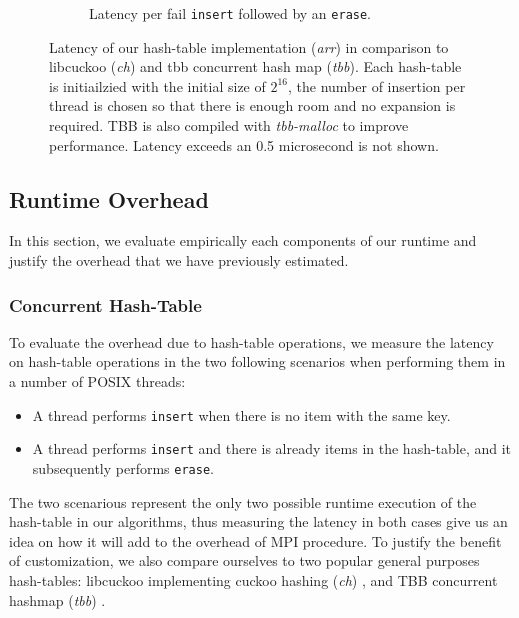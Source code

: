 \begin{figure}[ht]
\begin{adjustbox}{width=\textwidth}
\begin{subfigure}{\columnwidth}
      \caption{Latency per fail \texttt{insert} followed by an \texttt{erase}.}
    \end{subfigure}
  \end{adjustbox}

  \caption{Latency of our hash-table implementation (\textit{arr}) in comparison
  to libcuckoo (\textit{ch}) and tbb concurrent hash map (\textit{tbb}).  Each
  hash-table is initiailzied with the initial size of $2^{16}$, the number of
  insertion per thread is chosen so that there is enough room and no expansion is
  required. TBB is also compiled with \textit{tbb-malloc} to improve performance.
  Latency exceeds an 0.5 microsecond is not shown.\label{fig:hash-table}}

\end{figure}

\subsection{Runtime Overhead}
In this section, we evaluate empirically each components of our runtime and
justify the overhead that we have previously estimated.

\subsubsection{Concurrent Hash-Table}
To evaluate the overhead due to hash-table operations, we measure the latency 
on hash-table operations in the two following scenarios when performing them
in a number of POSIX threads:

\begin{itemize}
  \item A thread performs \texttt{insert} when there is no item with the same key.
  \item A thread performs \texttt{insert} and there is already items in the hash-table, and it subsequently
    performs \texttt{erase}.
\end{itemize}

 The two scenarious represent the only two possible runtime execution of the
 hash-table in our algorithms, thus measuring the latency in both cases give us
 an idea on how it will add to the overhead of MPI procedure. To justify the
 benefit of customization, we also compare ourselves to two popular general
 purposes hash-tables: libcuckoo implementing cuckoo hashing (\textit{ch})
 \cite{chasing}, and TBB concurrent hashmap (\textit{tbb}) \cite{tbb}.

